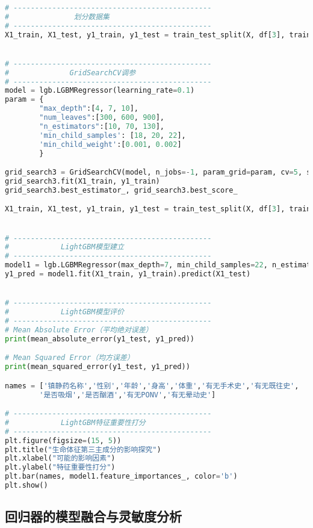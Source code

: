 \begin{lstlisting}[language=Python]
# ----------------------------------------------
#               划分数据集
# ----------------------------------------------
X1_train, X1_test, y1_train, y1_test = train_test_split(X, df[3], train_size=0.8, random_state=1)


# ----------------------------------------------
#              GridSearchCV调参
# ----------------------------------------------
model = lgb.LGBMRegressor(learning_rate=0.1)
param = {
        "max_depth":[4, 7, 10],
        "num_leaves":[300, 600, 900],
        "n_estimators":[10, 70, 130],
        'min_child_samples': [18, 20, 22],
        'min_child_weight':[0.001, 0.002]
        }

grid_search3 = GridSearchCV(model, n_jobs=-1, param_grid=param, cv=5, scoring="neg_mean_squared_error")
grid_search3.fit(X1_train, y1_train)
grid_search3.best_estimator_, grid_search3.best_score_

X1_train, X1_test, y1_train, y1_test = train_test_split(X, df[3], train_size=0.8, random_state=1)


# ----------------------------------------------
#            LightGBM模型建立
# ----------------------------------------------
model1 = lgb.LGBMRegressor(max_depth=7, min_child_samples=22, n_estimators=10,num_leaves=300)
y1_pred = model1.fit(X1_train, y1_train).predict(X1_test)


# ----------------------------------------------
#            LightGBM模型评价
# ----------------------------------------------
# Mean Absolute Error（平均绝对误差）
print(mean_absolute_error(y1_test, y1_pred))

# Mean Squared Error（均方误差）
print(mean_squared_error(y1_test, y1_pred))

names = ['镇静药名称','性别','年龄','身高','体重','有无手术史','有无既往史',  
        '是否吸烟','是否酗酒','有无PONV','有无晕动史']

# ----------------------------------------------
#            LightGBM特征重要性打分
# ----------------------------------------------
plt.figure(figsize=(15, 5))
plt.title("生命体征第三主成分的影响探究")
plt.xlabel("可能的影响因素")
plt.ylabel("特征重要性打分")
plt.bar(names, model1.feature_importances_, color='b')
plt.show()
\end{lstlisting}

\subsection{回归器的模型融合与灵敏度分析}

